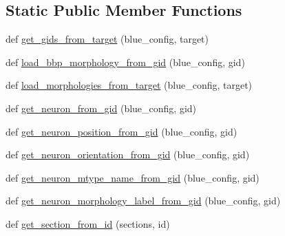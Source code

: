 \subsection*{Static Public Member Functions}
\begin{DoxyCompactItemize}
\item 
def \hyperlink{classmeshy_1_1neuromorphovis_1_1file_1_1readers_1_1morphology_1_1bbp__reader_1_1BBPReader_afd49f91ea557d86ba8cfe08120ed1066}{get\+\_\+gids\+\_\+from\+\_\+target} (blue\+\_\+config, target)
\item 
def \hyperlink{classmeshy_1_1neuromorphovis_1_1file_1_1readers_1_1morphology_1_1bbp__reader_1_1BBPReader_a4a9ab66f60970c4d94312306d5b57a5c}{load\+\_\+bbp\+\_\+morphology\+\_\+from\+\_\+gid} (blue\+\_\+config, gid)
\item 
def \hyperlink{classmeshy_1_1neuromorphovis_1_1file_1_1readers_1_1morphology_1_1bbp__reader_1_1BBPReader_ab17cf6c1f3ca1dc3874552f589cee3aa}{load\+\_\+morphologies\+\_\+from\+\_\+target} (blue\+\_\+config, target)
\item 
def \hyperlink{classmeshy_1_1neuromorphovis_1_1file_1_1readers_1_1morphology_1_1bbp__reader_1_1BBPReader_a52439e85a24de7b28dd9d2b1f8acce4a}{get\+\_\+neuron\+\_\+from\+\_\+gid} (blue\+\_\+config, gid)
\item 
def \hyperlink{classmeshy_1_1neuromorphovis_1_1file_1_1readers_1_1morphology_1_1bbp__reader_1_1BBPReader_a7e4c25ca9a11c8fc1b642c17991948bf}{get\+\_\+neuron\+\_\+position\+\_\+from\+\_\+gid} (blue\+\_\+config, gid)
\item 
def \hyperlink{classmeshy_1_1neuromorphovis_1_1file_1_1readers_1_1morphology_1_1bbp__reader_1_1BBPReader_a20a263a9715922ff37f68c8b9248bc1a}{get\+\_\+neuron\+\_\+orientation\+\_\+from\+\_\+gid} (blue\+\_\+config, gid)
\item 
def \hyperlink{classmeshy_1_1neuromorphovis_1_1file_1_1readers_1_1morphology_1_1bbp__reader_1_1BBPReader_a9a8079f0dc359bf2ebbbef684d1201eb}{get\+\_\+neuron\+\_\+mtype\+\_\+name\+\_\+from\+\_\+gid} (blue\+\_\+config, gid)
\item 
def \hyperlink{classmeshy_1_1neuromorphovis_1_1file_1_1readers_1_1morphology_1_1bbp__reader_1_1BBPReader_aec604c9ae9a39337417bd14393324f2e}{get\+\_\+neuron\+\_\+morphology\+\_\+label\+\_\+from\+\_\+gid} (blue\+\_\+config, gid)
\item 
def \hyperlink{classmeshy_1_1neuromorphovis_1_1file_1_1readers_1_1morphology_1_1bbp__reader_1_1BBPReader_a4febaaaeb55fa4fb8d35cac92f7135d3}{get\+\_\+section\+\_\+from\+\_\+id} (sections, id)
\item 

\end{DoxyCompactItemize}
